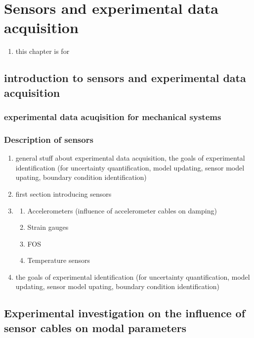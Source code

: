 \chapter{Sensors and experimental data acquisition}\label{ch:Experimental_data_acquisition}


\begin{enumerate}
    \item this chapter is for
\end{enumerate}



\section{introduction to sensors and experimental data acquisition}
\subsection{experimental data acuqisition for mechanical systems}
\subsection{Description of sensors}

\begin{enumerate}
    \item general stuff about experimental data acquisition, the goals of experimental identification (for uncertainty quantification, model updating, sensor model upating, boundary condition identification)
    \item first section introducing sensors
    \item \begin{enumerate}
              \item Accelerometers (influence of accelerometer cables on damping)
              \item Strain gauges
              \item FOS
              \item Temperature sensors
          \end{enumerate}
    \item the goals of experimental identification (for uncertainty quantification, model updating, sensor model upating, boundary condition identification)
\end{enumerate}

\section{Experimental investigation on the influence of sensor cables on modal parameters}

